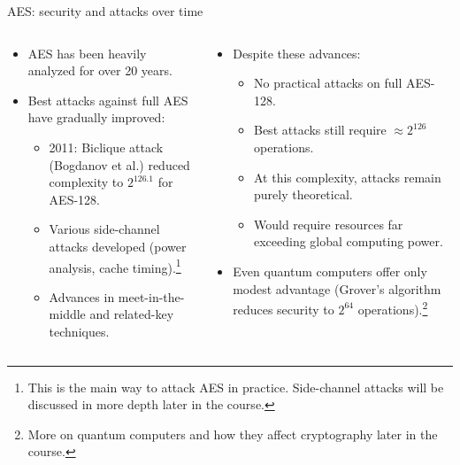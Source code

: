 \documentclass[aspectratio=169, lualatex, handout]{beamer}
\begin{document}
\begin{frame}{AES: security and attacks over time}
	\begin{columns}[c]
		\begin{column}{0.5\textwidth}
			\begin{itemize}[<+->]
				\item AES has been heavily analyzed for over 20 years.
				\item Best attacks against full AES have gradually improved:
				      \begin{itemize}[<+->]
					      \item 2011: Biclique attack (Bogdanov et al.) reduced complexity to $2^{126.1}$ for AES-128.
					      \item Various side-channel attacks developed (power analysis, cache timing).\footnote{This is the main way to attack AES in practice. Side-channel attacks will be discussed in more depth later in the course.}
					      \item Advances in meet-in-the-middle and related-key techniques.
				      \end{itemize}
			\end{itemize}
		\end{column}
		\begin{column}{0.5\textwidth}
			\begin{itemize}[<+->]
				\item Despite these advances:
				      \begin{itemize}[<+->]
					      \item No practical attacks on full AES-128.
					      \item Best attacks still require $\approx 2^{126}$ operations.
					      \item At this complexity, attacks remain purely theoretical.
					      \item Would require resources far exceeding global computing power.
				      \end{itemize}
				\item Even quantum computers offer only modest advantage (Grover's algorithm reduces security to $2^{64}$ operations).\footnote{More on quantum computers and how they affect cryptography later in the course.}
			\end{itemize}
		\end{column}
	\end{columns}
\end{frame}

\begin{frame}[plain]
	\titlepage
\end{frame}
\end{document}
